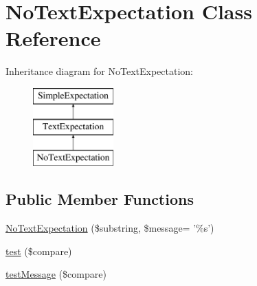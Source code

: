 \hypertarget{class_no_text_expectation}{
\section{NoTextExpectation Class Reference}
\label{class_no_text_expectation}
}
Inheritance diagram for NoTextExpectation:\begin{figure}[H]
\begin{center}
\leavevmode
\includegraphics[height=3.000000cm]{class_no_text_expectation}
\end{center}
\end{figure}
\subsection*{Public Member Functions}
\begin{DoxyCompactItemize}
\item 
\hyperlink{class_no_text_expectation_a5fa890c550df5e3ecf2e17719fac8412}{NoTextExpectation} (\$substring, \$message= '\%s')
\item 
\hyperlink{class_no_text_expectation_aea5e85eb1d03d5f48cb463f09d756a9e}{test} (\$compare)
\item 
\hyperlink{class_no_text_expectation_ab233e35e0f5912da893c34c8eda835fc}{testMessage} (\$compare)
\end{DoxyCompactItemize}


